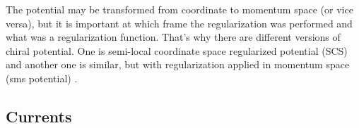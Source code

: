 The potential may be transformed from coordinate to momentum space (or vice versa),
but it is important at which frame the regularization was performed
and what was a regularization function. That's why there are different 
versions of chiral potential. One is semi-local coordinate space regularized potential (SCS) \cite{Epelbaum2014SCS}
and another one is similar, but with regularization applied in momentum space (\gls*{sms} potential) \cite{reinkrebs2018}.


\subsection*{Currents}
 


